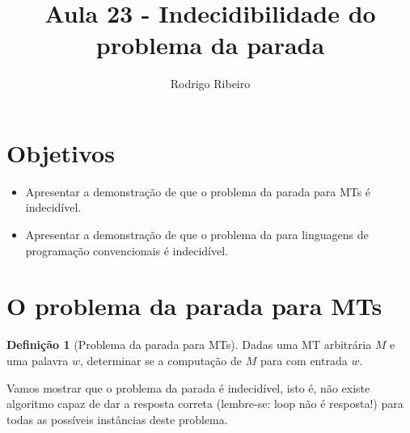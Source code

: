 \documentclass[a4paper]{article}
\theoremstyle{definition}
\newtheorem{Definition}{Definição}
\begin{document}
\title{Aula 23 - Indecidibilidade do problema da parada}
  \author{Rodrigo Ribeiro}

  \maketitle

  \pagestyle{fancy}


  \section*{Objetivos}

  \begin{itemize}
     \item Apresentar a demonstração de que o problema da
           parada para MTs é indecidível.
     \item Apresentar a demonstração de que o problema da
           para linguagens de programação convencionais
           é indecidível.
  \end{itemize}


  \section{O problema da parada para MTs}

  \begin{Definition}[Problema da parada para MTs]
    Dadas uma MT arbitrária $M$ e uma palavra $w$, determinar se a computação
    de $M$ para com entrada $w$.
  \end{Definition}

  Vamos mostrar que o problema da parada é indecidível, isto é, não existe
  algoritmo capaz de dar a resposta correta (lembre-se: loop não é resposta!)
  para todas as possíveis instâncias deste problema.
\end{document}
